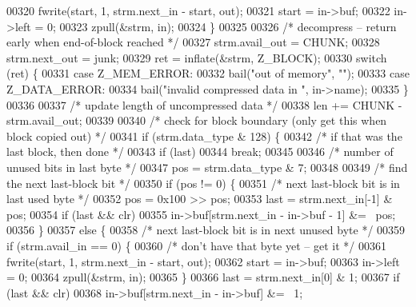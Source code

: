 \begin{DoxyCode}
{00320             fwrite(start, 1, strm.next\_in - start, out);
00321             start = in->buf;
00322             in->left = 0;
00323             zpull(&strm, in);
00324         \}
00325 
00326         \textcolor{comment}{/* decompress -- return early when end-of-block reached */}
00327         strm.avail\_out = CHUNK;
00328         strm.next\_out = junk;
00329         ret = inflate(&strm, Z\_BLOCK);
00330         \textcolor{keywordflow}{switch} (ret) \{
00331         \textcolor{keywordflow}{case} Z\_MEM\_ERROR:
00332             bail(\textcolor{stringliteral}{"out of memory"}, \textcolor{stringliteral}{""});
00333         \textcolor{keywordflow}{case} Z\_DATA\_ERROR:
00334             bail(\textcolor{stringliteral}{"invalid compressed data in "}, in->name);
00335         \}
00336 
00337         \textcolor{comment}{/* update length of uncompressed data */}
00338         len += CHUNK - strm.avail\_out;
00339 
00340         \textcolor{comment}{/* check for block boundary (only get this when block copied out) */}
00341         \textcolor{keywordflow}{if} (strm.data\_type & 128) \{
00342             \textcolor{comment}{/* if that was the last block, then done */}
00343             \textcolor{keywordflow}{if} (last)
00344                 \textcolor{keywordflow}{break};
00345 
00346             \textcolor{comment}{/* number of unused bits in last byte */}
00347             pos = strm.data\_type & 7;
00348 
00349             \textcolor{comment}{/* find the next last-block bit */}
00350             \textcolor{keywordflow}{if} (pos != 0) \{
00351                 \textcolor{comment}{/* next last-block bit is in last used byte */}
00352                 pos = 0x100 >> pos;
00353                 last = strm.next\_in[-1] & pos;
00354                 \textcolor{keywordflow}{if} (last && clr)
00355                     in->buf[strm.next\_in - in->buf - 1] &= ~pos;
00356             \}
00357             \textcolor{keywordflow}{else} \{
00358                 \textcolor{comment}{/* next last-block bit is in next unused byte */}
00359                 \textcolor{keywordflow}{if} (strm.avail\_in == 0) \{
00360                     \textcolor{comment}{/* don't have that byte yet -- get it */}
00361                     fwrite(start, 1, strm.next\_in - start, out);
00362                     start = in->buf;
00363                     in->left = 0;
00364                     zpull(&strm, in);
00365                 \}
00366                 last = strm.next\_in[0] & 1;
00367                 \textcolor{keywordflow}{if} (last && clr)
00368                     in->buf[strm.next\_in - in->buf] &= ~1;
}
\end{DoxyCode}
